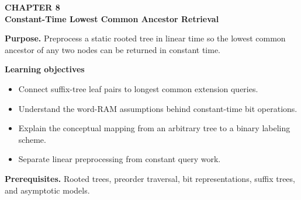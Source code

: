 \documentclass[11pt]{article}
\begin{document}
\begin{tcolorbox}[
  enhanced,breakable,colback=Primary!4,colframe=Primary,boxrule=0.9pt,
  arc=2mm,left=3mm,right=3mm,top=2.5mm,bottom=2.5mm]
{\sffamily\color{Accent}\bfseries CHAPTER 8}\\[-1pt]
{\sffamily\LARGE\bfseries\color{Primary} Constant-Time Lowest Common Ancestor Retrieval}

\vspace{2pt}
\textbf{Purpose.} Preprocess a static rooted tree in linear time so the lowest common ancestor of any two nodes can be returned in constant time.

\textbf{Learning objectives}
\begin{itemize}
  \item Connect suffix-tree leaf pairs to longest common extension queries.
  \item Understand the word-RAM assumptions behind constant-time bit operations.
  \item Explain the conceptual mapping from an arbitrary tree to a binary labeling scheme.
  \item Separate linear preprocessing from constant query work.
\end{itemize}

\textbf{Prerequisites.} Rooted trees, preorder traversal, bit representations, suffix trees, and asymptotic models.
\end{tcolorbox}
\end{document}
